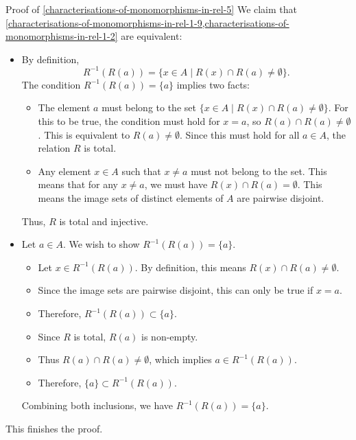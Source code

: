 \begin{Proof}{Proof of \cref{characterisations-of-monomorphisms-in-rel-5}}
    We claim that \cref{characterisations-of-monomorphisms-in-rel-1-9,characterisations-of-monomorphisms-in-rel-1-2} are equivalent:
    \begin{itemize}
        \item{}By definition,
            \[
                R^{-1}(R(a))%
                =%
                \{x\in A \mid R(x)\cap R(a)\neq\emptyset\}.%
            \]%
            The condition $R^{-1}(R(a))=\{a\}$ implies two facts:
            \begin{itemize}
                \item The element $a$ must belong to the set $\{x\in A \mid R(x)\cap R(a)\neq\emptyset\}$. For this to be true, the condition must hold for $x=a$, so $R(a)\cap R(a)\neq\emptyset$. This is equivalent to $R(a)\neq\emptyset$. Since this must hold for all $a\in A$, the relation $R$ is total.
                \item Any element $x\in A$ such that $x\neq a$ must not belong to the set. This means that for any $x\neq a$, we must have $R(x)\cap R(a) = \emptyset$. This means the image sets of distinct elements of $A$ are pairwise disjoint.
            \end{itemize}
            Thus, $R$ is total and injective.
        \item{}Let $a\in A$. We wish to show $R^{-1}(R(a))=\{a\}$.
        \begin{itemize}
            \item Let $x\in R^{-1}(R(a))$. By definition, this means $R(x)\cap R(a)\neq\emptyset$.
            \item Since the image sets are pairwise disjoint, this can only be true if $x=a$.
            \item Therefore, $R^{-1}(R(a))\subset\{a\}$.
            \item Since $R$ is total, $R(a)$ is non-empty.
            \item Thus $R(a)\cap R(a)\neq\emptyset$, which implies $a\in R^{-1}(R(a))$.
            \item Therefore, $\{a\}\subset R^{-1}(R(a))$.
        \end{itemize}
        Combining both inclusions, we have $R^{-1}(R(a))=\{a\}$.
    \end{itemize}
    This finishes the proof.
\end{Proof}
